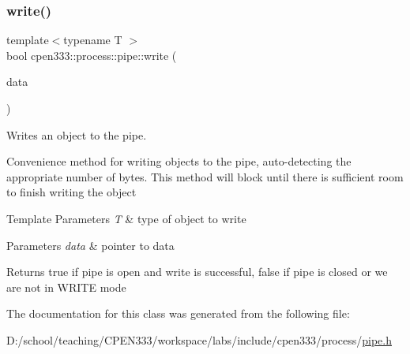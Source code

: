 \subsubsection{\texorpdfstring{write()}{write()}\hspace{0.1cm}{\footnotesize\ttfamily [3/3]}}
{\footnotesize\ttfamily template$<$typename T $>$ \\
bool cpen333\+::process\+::pipe\+::write (\begin{DoxyParamCaption}\item[{const T $\ast$}]{data }\end{DoxyParamCaption})\hspace{0.3cm}{\ttfamily [inline]}}



Writes an object to the pipe. 

Convenience method for writing objects to the pipe, auto-\/detecting the appropriate number of bytes. This method will block until there is sufficient room to finish writing the object


\begin{DoxyTemplParams}{Template Parameters}
{\em T} & type of object to write \\
\hline
\end{DoxyTemplParams}

\begin{DoxyParams}{Parameters}
{\em data} & pointer to data \\
\hline
\end{DoxyParams}
\begin{DoxyReturn}{Returns}
true if pipe is open and write is successful, false if pipe is closed or we are not in W\+R\+I\+TE mode 
\end{DoxyReturn}


The documentation for this class was generated from the following file\+:\begin{DoxyCompactItemize}
\item 
D\+:/school/teaching/\+C\+P\+E\+N333/workspace/labs/include/cpen333/process/\hyperlink{pipe_8h}{pipe.\+h}\end{DoxyCompactItemize}
